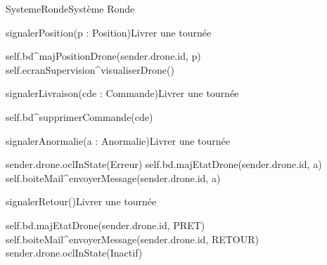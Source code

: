 \begin{OM}{SystemeRonde}{Système Ronde}
    \begin{OMOperation}{signalerPosition(p : Position)}{Livrer une tournée}{}
        \begin{OMMessages}
        \end{OMMessages}
        \OMNoPre
        \begin{OMPost}
self.bd^majPositionDrone(sender.drone.id, p)
self.ecranSupervision^visualiserDrone()
        \end{OMPost}
    \end{OMOperation}

    \begin{OMOperation}{signalerLivraison(cde : Commande)}{Livrer une tournée}{}
        \begin{OMMessages}
        \end{OMMessages}
        \OMNoPre
        \begin{OMPost}
self.bd^supprimerCommande(cde)
        \end{OMPost}
    \end{OMOperation}

    \begin{OMOperation}{signalerAnormalie(a : Anormalie)}{Livrer une tournée}{}
        \begin{OMMessages}
        \end{OMMessages}
        \OMNoPre
        \begin{OMPost}
sender.drone.oclInState(Erreur)
self.bd.majEtatDrone(sender.drone.id, a)
self.boiteMail^envoyerMessage(sender.drone.id, a)
        \end{OMPost}
    \end{OMOperation}

    \begin{OMOperation}{signalerRetour()}{Livrer une tournée}{}
        \begin{OMMessages}
        \end{OMMessages}
        \OMNoPre
        \begin{OMPost}
self.bd.majEtatDrone(sender.drone.id, PRET)
self.boiteMail^envoyerMessage(sender.drone.id, RETOUR)
sender.drone.oclInState(Inactif)
        \end{OMPost}
    \end{OMOperation}


\end{OM}
